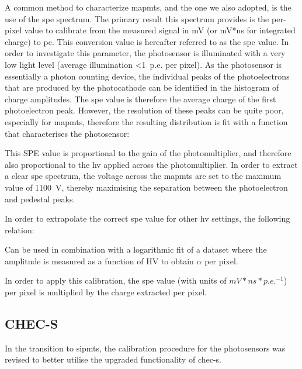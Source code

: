 A common method to characterize \glspl{mapmt}, and the one we also adopted, is the use of the \gls{spe} spectrum. The primary result this spectrum provides is the per-pixel value to calibrate from the measured signal in mV (or mV*ns for integrated charge) to \gls{pe}. This conversion value is hereafter referred to as the \gls{spe} value. In order to investigate this parameter, the photosensor is illuminated with a very low light level (average illumination <1~p.e. per pixel). As the photosensor is essentially a photon counting device, the individual peaks of the photoelectrons that are produced by the photocathode can be identified in the histogram of charge amplitudes. The \gls{spe} value is therefore the average charge of the first photoelectron peak. However, the resolution of these peaks can be quite poor, especially for \glspl{mapmt}, therefore the resulting distribution is fit with a function that characterises the photosensor: 


This SPE value is proportional to the gain of the photomultiplier, and therefore also proportional to the \gls{hv} applied across the photomultiplier. In order to extract a clear \gls{spe} spectrum, the voltage across the \glspl{mapmt} are set to the maximum value of 1100~V, thereby maximising the separation between the photoelectron and pedestal peaks.

In order to extrapolate the correct \gls{spe} value for other \gls{hv} settings, the following relation:

Can be used in combination with a logarithmic  fit of a dataset where the amplitude is measured as a function of HV to obtain $\alpha$ per pixel. 


In order to apply this calibration, the \gls{spe} value (with units of $mV*ns*p.e.^{-1}$) per pixel is multiplied by the charge extracted per pixel. 

\subsection{CHEC-S}

In the transition to \glspl{sipmt}, the calibration procedure for the photosensors was revised to better utilise the upgraded functionality of \gls{chec-s}. 

